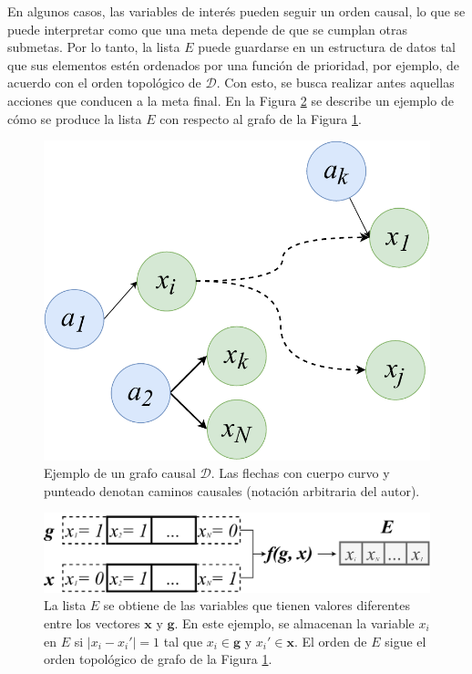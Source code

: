 En algunos casos, las variables de interés pueden seguir un orden causal, lo que se puede interpretar como que una meta depende de que se cumplan otras submetas.
Por lo tanto, la lista $E$ puede guardarse en un estructura de datos tal que sus elementos estén ordenados por una función de prioridad, por ejemplo, de acuerdo con el orden topológico de $\mathcal{D}$. Con esto, se busca realizar antes aquellas acciones que conducen a la meta final.
En la Figura \ref{fig:e-list} se describe un ejemplo de cómo se produce la lista $E$ con respecto al grafo de la Figura \ref{fig:example-d}. 


\begin{figure}[h]
    \centering
    \includegraphics[scale=0.3]{Chapter4/Figs/examplegraph.pdf}
    \caption{Ejemplo de un grafo causal $\mathcal{D}$. Las flechas con cuerpo curvo y punteado denotan caminos causales (notación arbitraria del autor).}
    \label{fig:example-d}
\end{figure} 


\begin{figure}[h]
    \centering
    \includegraphics[scale=0.45]{Chapter4/Figs/listofinterest.pdf}
    \caption{La lista $E$ se obtiene de las variables que tienen valores diferentes entre los vectores $\mathbf{x}$ y $\mathbf{g}$. En este ejemplo, se almacenan la variable $x_i$ en $E$ si $|x_i - x_i' | = 1$ tal que $x_i\in \mathbf{g}$ y $x_i' \in \mathbf{x}$. El orden de $E$ sigue el orden topológico de grafo de la Figura \ref{fig:example-d}.}
    \label{fig:e-list}
\end{figure} 

